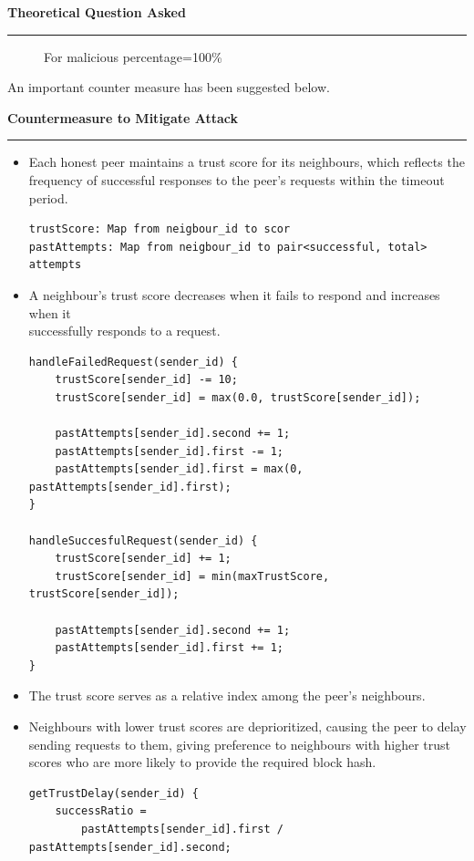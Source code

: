 \documentclass[a4paper,12pt]{article}
\newenvironment{solution}[2][]{%
\begin{mdframed}[linecolor=blue!70!black, linewidth=2pt, roundcorner=10pt, backgroundcolor=yellow!10!white, skipabove=12pt, skipbelow=12pt]%
	\textbf{\large #2}
	\par\noindent\rule{\textwidth}{0.4pt}
}{
\end{mdframed}
}
\begin{document}
\begin{solution}{Theoretical Question Asked}
\begin{figure}[H]
		\caption{For malicious percentage=100\%}
	\end{figure}
	An important counter measure has been suggested below.
\end{solution}
\begin{solution}{Countermeasure to Mitigate Attack}
\begin{itemize}
	\item Each honest peer maintains a trust score for its neighbours, which reflects the frequency of successful responses to the peer's requests within the timeout period.
	\begin{mdframed}[linecolor=black, linewidth=2pt, roundcorner=10pt, backgroundcolor=yellow!10!white, skipabove=12pt, skipbelow=12pt]
		\begin{verbatim}
trustScore: Map from neigbour_id to scor
pastAttempts: Map from neigbour_id to pair<successful, total> attempts 
		\end{verbatim}
		\end{mdframed}
	\item A neighbour's trust score decreases when it fails to respond and increases when it\\ successfully responds to a request.
	\begin{mdframed}[linecolor=black, linewidth=2pt, roundcorner=10pt, backgroundcolor=yellow!10!white, skipabove=12pt, skipbelow=12pt]
		\begin{verbatim}
handleFailedRequest(sender_id) {
	trustScore[sender_id] -= 10;
	trustScore[sender_id] = max(0.0, trustScore[sender_id]);

	pastAttempts[sender_id].second += 1;
	pastAttempts[sender_id].first -= 1;
	pastAttempts[sender_id].first = max(0, pastAttempts[sender_id].first);
}

handleSuccesfulRequest(sender_id) {
	trustScore[sender_id] += 1;
	trustScore[sender_id] = min(maxTrustScore, trustScore[sender_id]);

	pastAttempts[sender_id].second += 1;
	pastAttempts[sender_id].first += 1;
}
		\end{verbatim}
		\end{mdframed}
	\item The trust score serves as a relative index among the peer's neighbours.
	\item Neighbours with lower trust scores are deprioritized, causing the peer to delay sending requests to them, giving preference to neighbours with higher trust scores who are more likely to provide the required block hash.
	\begin{mdframed}[linecolor=black, linewidth=2pt, roundcorner=10pt, backgroundcolor=yellow!10!white, skipabove=12pt, skipbelow=12pt]
		\begin{verbatim}
getTrustDelay(sender_id) {
	successRatio = 
		pastAttempts[sender_id].first / pastAttempts[sender_id].second;


\end{verbatim}
\end{mdframed}
\end{itemize}
\end{solution}
\end{document}
